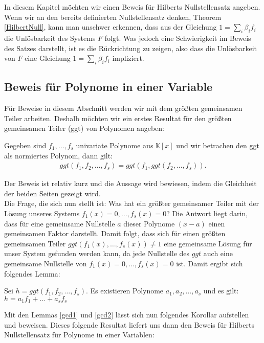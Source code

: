 In diesem Kapitel möchten wir einen Beweis für Hilberts Nullstellensatz angeben.
Wenn wir an den bereits definierten Nullstellensatz denken, Theorem \ref{HilbertNull}, kann man unschwer erkennen, dass aus der Gleichung $1 = \sum_i \beta_if_i$ die Unlösbarkeit des Systems $F$ folgt. Was jedoch eine Schwierigkeit im Beweis des Satzes darstellt, ist es die Rückrichtung zu zeigen, also dass die Unlösbarkeit von $F$ eine Gleichung $1 = \sum_i \beta_if_i$ impliziert.

\subsection{Beweis für Polynome in einer Variable}

Für Beweise in diesem Abschnitt werden wir mit dem größten gemeinsamen Teiler arbeiten. Deshalb möchten wir ein erstes Resultat für den größten gemeinsamen Teiler (ggt) von Polynomen angeben:
\begin{lemma} \label{gcd1}
Gegeben sind $f_1,\ldots ,f_s$ univariate Polynome aus $\mathbb{K}[x]$ und wir betrachen den ggt als normiertes Polynom, dann gilt:
\begin{align*}
ggt (f_1,f_2,\ldots,f_s) = ggt(f_1,ggt(f_2,\ldots,f_s)).
\end{align*}
\end{lemma}

\noindent Der Beweis ist relativ kurz und die Aussage wird bewiesen, indem die Gleichheit der beiden Seiten gezeigt wird.\\
\noindent Die Frage, die sich nun stellt ist: Was hat ein größter gemeinsamer Teiler mit der Lösung unseres Systems $f_1(x)=0,\ldots,f_s(x)=0$? Die Antwort liegt darin, dass für eine gemeinsame Nullstelle $a$ dieser Polynome $(x-a)$ einen gemeinsamen Faktor darstellt. Damit folgt, dass sich für einen größten gemeinsamen Teiler $ggt(f_1(x),\ldots,f_s(x)) \not = 1$ eine gemeinsame Lösung für unser System gefunden werden kann, da jede Nullstelle des $ggt$ auch eine gemeinsame Nullstelle von $f_1(x)=0,\ldots,f_s(x)=0$ ist. Damit ergibt sich folgendes Lemma:

\begin{lemma} \label{gcd2}
Sei $h = ggt(f_1,f_2,\ldots,f_s)$. Es existieren Polynome $a_1,a_2,\ldots,a_s$ und es gilt: $h = a_1f_1+ \ldots + a_sf_s$
\end{lemma}

\noindent Mit den Lemmas \ref{gcd1} und \ref{gcd2} lässt sich nun folgendes Korollar aufstellen und beweisen. Dieses folgende Resultat liefert uns dann den Beweis für Hilberts Nullstellensatz für Polynome in einer Variablen:

